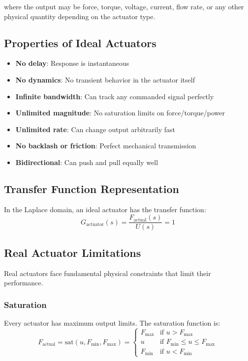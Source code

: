 where the output may be force, torque, voltage, current, flow rate, or any other physical quantity depending on the actuator type.

\subsection{Properties of Ideal Actuators}

\begin{itemize}
    \item \textbf{No delay}: Response is instantaneous
    \item \textbf{No dynamics}: No transient behavior in the actuator itself
    \item \textbf{Infinite bandwidth}: Can track any commanded signal perfectly
    \item \textbf{Unlimited magnitude}: No saturation limits on force/torque/power
    \item \textbf{Unlimited rate}: Can change output arbitrarily fast
    \item \textbf{No backlash or friction}: Perfect mechanical transmission
    \item \textbf{Bidirectional}: Can push and pull equally well
\end{itemize}

\subsection{Transfer Function Representation}

In the Laplace domain, an ideal actuator has the transfer function:
\begin{equation}
G_{\text{actuator}}(s) = \frac{F_{\text{actual}}(s)}{U(s)} = 1
\label{eq:ideal_actuator_tf}
\end{equation}

\subsection{Real Actuator Limitations}

Real actuators face fundamental physical constraints that limit their performance.

\subsubsection{Saturation}

Every actuator has maximum output limits. The saturation function is:
\begin{equation}
\boxed{F_{\text{actual}} = \text{sat}(u, F_{\min}, F_{\max}) = \begin{cases}
F_{\max} & \text{if } u > F_{\max} \\
u & \text{if } F_{\min} \leq u \leq F_{\max} \\
F_{\min} & \text{if } u < F_{\min}
\end{cases}}
\label{eq:saturation}
\end{equation}

